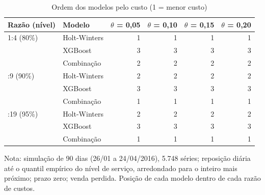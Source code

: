 \begin{table}[htbp]
\centering
\small
\caption{Ordem dos modelos pelo custo (1 = menor custo)}
\label{tab:sim_ordem}
\begin{tabular}{llrrrr}
\toprule
Razão (nível) & Modelo & $\theta$ = 0,05 & $\theta$ = 0,10 & $\theta$ = 0,15 & $\theta$ = 0,20 \\
\midrule
1:4 (80\%) & Holt-Winters & 1 & 1 & 1 & 1 \\
 & XGBoost & 3 & 3 & 3 & 3 \\
 & Combinação & 2 & 2 & 2 & 2 \\
\addlinespace
1:9 (90\%) & Holt-Winters & 2 & 2 & 2 & 2 \\
 & XGBoost & 3 & 3 & 3 & 3 \\
 & Combinação & 1 & 1 & 1 & 1 \\
\addlinespace
1:19 (95\%) & Holt-Winters & 2 & 2 & 2 & 2 \\
 & XGBoost & 3 & 3 & 3 & 3 \\
 & Combinação & 1 & 1 & 1 & 1 \\
\bottomrule
\end{tabular}
\par\smallskip
{\footnotesize Nota: simulação de 90 dias (26/01 a 24/04/2016), 5.748 séries; reposição diária até o quantil empírico do nível de serviço, arredondado para o inteiro mais próximo; prazo zero; venda perdida. Posição de cada modelo dentro de cada razão de custos.}
\end{table}
